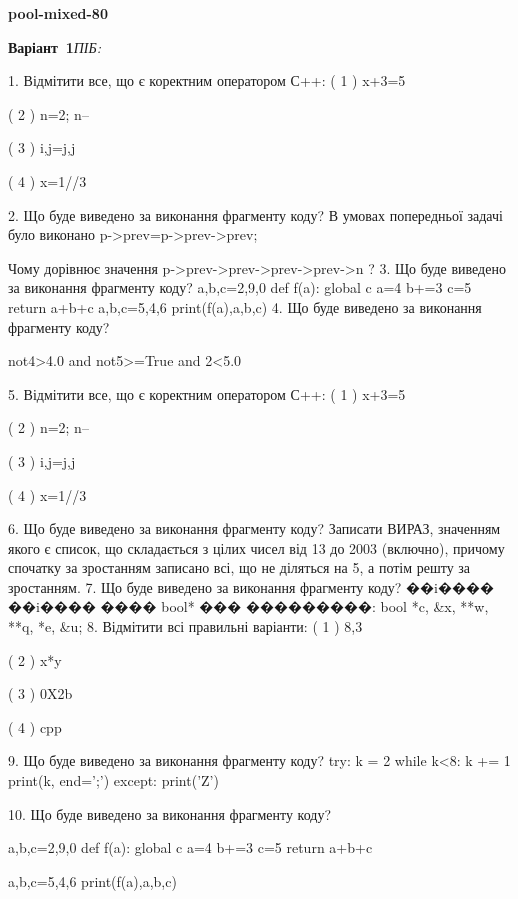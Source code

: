 \documentclass[11pt]{article}
\begin{document}
{\large\textbf{pool-mixed-80}}

\textbf{Варіант \No\,1}\hfill \textit{ПІБ:}\,\underline{\hspace{60mm}}
\vspace{4mm}

1. Відмітити все, що є коректним оператором С++:
( 1 ) x+3=5

( 2 ) n=2; n--

( 3 ) i,j=j,j

( 4 ) x=1//3

2. Що буде виведено за виконання фрагменту коду?
В умовах попередньої задачі було виконано p->prev=p->prev->prev;

Чому дорівнює значення p->prev->prev->prev->prev->n ?
3. Що буде виведено за виконання фрагменту коду?
a,b,c=2,9,0
    def f(a):
      global c      a=4
      b+=3
      c=5
      return a+b+c
    a,b,c=5,4,6
    print(f(a),a,b,c)
4. Що буде виведено за виконання фрагменту коду?

not4>4.0 and not5>=True and 2<5.0

5. Відмітити все, що є коректним оператором С++:
( 1 ) x+3=5

( 2 ) n=2; n--

( 3 ) i,j=j,j

( 4 ) x=1//3

6. Що буде виведено за виконання фрагменту коду?
Записати ВИРАЗ, значенням якого є список, що складається з цілих чисел від 13 до 2003 (включно), причому спочатку за зростанням записано всі, що не діляться на 5, а потім решту за зростанням.
7. Що буде виведено за виконання фрагменту коду?
��i���� ��i���� ���� bool* ��� ���������: bool *c, &x, **w, **q, *e, &u;
8. Відмітити всі правильні варіанти:
( 1 ) 8,3

( 2 ) x*y

( 3 ) 0X2b

( 4 ) cpp

9. Що буде виведено за виконання фрагменту коду?
try:
    k = 2
    while k<8:
        k += 1
    print(k, end=';')
except:
    print('Z')

10. Що буде виведено за виконання фрагменту коду?

a,b,c=2,9,0
def f(a):
global c    a=4
    b+=3
    c=5
    return a+b+c

a,b,c=5,4,6
print(f(a),a,b,c)
\end{document}
